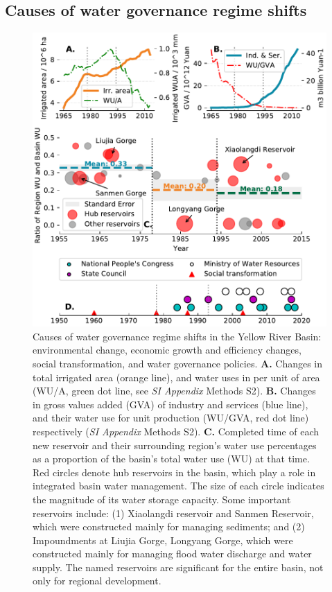 \documentclass[9pt, twocolumn, twoside, lineno]{pnas-new}
\begin{document}
\subsection*{Causes of water governance regime shifts}
\label{result2}

\begin{figure}[th!]
	\centering
	\includegraphics[width=\linewidth]{../../figures/main/causes.pdf}
	\caption{
		Causes of water governance regime shifts in the Yellow River Basin: environmental change, economic growth and efficiency changes, social transformation, and water governance policies.
		\textbf{A.} Changes in total irrigated area (orange line), and water uses in per unit of area (WU/A, green dot line, see \textit{SI Appendix} Methods S2).
		\textbf{B.} Changes in gross values added (GVA) of industry and services (blue line), and their water use for unit production (WU/GVA, red dot line) respectively (\textit{SI Appendix} Methods S2).
		\textbf{C.} Completed time of each new reservoir and their surrounding region's water use percentages as a proportion of the basin's total water use (WU) at that time. Red circles denote hub reservoirs in the basin, which play a role in integrated basin water management. 
		The size of each circle indicates the magnitude of its water storage capacity. Some important reservoirs include: (1) Xiaolangdi reservoir and Sanmen Reservoir, which were constructed mainly for managing sediments; and (2) Impoundments at Liujia Gorge, Longyang Gorge, which were constructed mainly for managing flood water discharge and water supply. The named reservoirs are significant for the entire basin, not only for regional development.
}
\end{figure}
\end{document}

